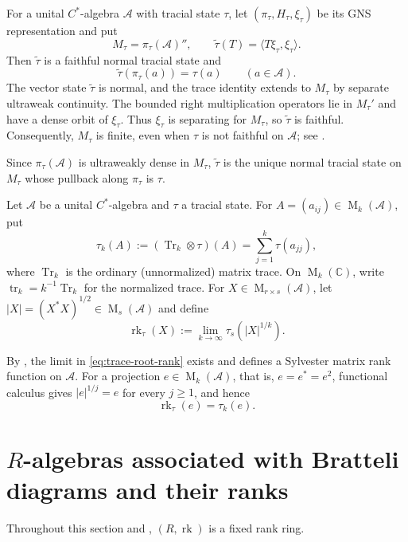 \documentclass[11pt]{amsart}
\DeclareMathOperator{\rk}{rk}
\DeclareMathOperator{\Mat}{M}
\theoremstyle{definition}
\theoremstyle{remark}
\begin{document}
For a unital $C^*$-algebra $\mathcal A$ with tracial state $\tau$,
let $(\pi_\tau,H_\tau,\xi_\tau)$ be its GNS representation and put
\begin{equation}\label{eq:gns-normal-trace}
 M_\tau=\pi_\tau(\mathcal A)'',\qquad
 \widetilde\tau(T)=\langle T\xi_\tau,\xi_\tau\rangle.
\end{equation}
Then $\widetilde\tau$ is a faithful normal tracial state and
\[
 \widetilde\tau(\pi_\tau(a))=\tau(a)\qquad(a\in\mathcal A).
\]
The vector state $\widetilde\tau$ is normal, and the trace identity
extends to $M_\tau$ by separate ultraweak continuity.
The bounded right multiplication operators lie in $M_\tau'$
and have a dense orbit of $\xi_\tau$.
Thus $\xi_\tau$ is separating for $M_\tau$, so
$\widetilde\tau$ is faithful.
Consequently, $M_\tau$ is finite, even when $\tau$ is not faithful on
$\mathcal A$; see \cite[Section~2.4]{JiangLi2021}.

Since $\pi_\tau(\mathcal A)$ is ultraweakly dense in $M_\tau$,
$\widetilde\tau$ is the unique normal tracial state on $M_\tau$
whose pullback along $\pi_\tau$ is $\tau$.

Let $\mathcal A$ be a unital $C^*$-algebra and $\tau$ a tracial state.
For $A = (a_{ij})\in\Mat_k(\mathcal A)$, put
\[
 \tau_k(A):=(\operatorname{Tr}_k\otimes\tau)(A)
 =\sum_{j=1}^k\tau(a_{jj}),
\]
where $\operatorname{Tr}_k$ is the ordinary (unnormalized) matrix trace.
On $\Mat_k(\mathbb C)$, write
$\operatorname{tr}_k=k^{-1}\operatorname{Tr}_k$ for the normalized trace.
For
$X\in\Mat_{r\times s}(\mathcal A)$, let
$|X|=(X^*X)^{1/2}\in\Mat_s(\mathcal A)$ and define
\begin{equation}\label{eq:trace-root-rank}
 \rk_\tau(X):=\lim_{k\to\infty}\tau_s(|X|^{1/k}).
\end{equation}

By \cite[Proposition~2.4]{JiangLi2021}, the limit in
\eqref{eq:trace-root-rank} exists and defines a Sylvester matrix
rank function on $\mathcal A$.
For a projection $e\in\Mat_k(\mathcal A)$, that is,
$e=e^*=e^2$, functional calculus gives
$|e|^{1/j}=e$ for every $j\geq1$, and hence
\[
  \rk_\tau(e)=\tau_k(e).
\]

\section{\texorpdfstring{$R$}{R}-algebras associated with Bratteli diagrams and their ranks}
\label{sec:bratteli-ranks}

Throughout this section and , $(R,\rk)$ is a fixed
rank ring.
\end{document}
